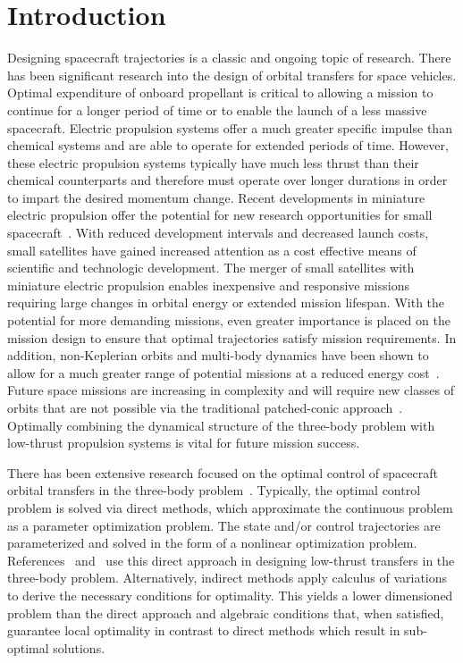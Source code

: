 \documentclass[preprint]{elsarticle}
\begin{document}
\section{Introduction}\label{sec:introduction}
Designing spacecraft trajectories is a classic and ongoing topic of research.
There has been significant research into the design of orbital transfers for space vehicles.
Optimal expenditure of onboard propellant is critical to allowing a mission to continue for a longer period of time or to enable the launch of a less massive spacecraft.
Electric propulsion systems offer a much greater specific impulse than chemical systems and are able to operate for extended periods of time.
However, these electric propulsion systems typically have much less thrust than their chemical counterparts and therefore must operate over longer durations in order to impart the desired momentum change.
Recent developments in miniature electric propulsion offer the potential for new research opportunities for small spacecraft~\cite{haque2013}.
With reduced development intervals and decreased launch costs, small satellites have gained increased attention as a cost effective means of scientific and technologic development. 
The merger of small satellites with miniature electric propulsion enables inexpensive and responsive missions requiring large changes in orbital energy or extended mission lifespan.
With the potential for more demanding missions, even greater importance is placed on the mission design to ensure that optimal trajectories satisfy mission requirements. 
In addition, non-Keplerian orbits and multi-body dynamics have been shown to allow for a much greater range of potential missions at a reduced energy cost~\cite{koon2011}.
Future space missions are increasing in complexity and will require new classes of orbits that are not possible via the traditional patched-conic approach~\cite{ross2006,gomez2001}.
Optimally combining the dynamical structure of the three-body problem with low-thrust propulsion systems is vital for future mission success.

There has been extensive research focused on the optimal control of spacecraft orbital transfers in the three-body problem~\cite{mingotti2011,grebow2011}.
Typically, the optimal control problem is solved via direct methods, which approximate the continuous problem as a parameter optimization problem.
The state and/or control trajectories are parameterized and solved in the form of a nonlinear optimization problem.
References~ and~ use this direct approach in designing low-thrust transfers in the three-body problem.
Alternatively, indirect methods apply calculus of variations to derive the necessary conditions for optimality. 
This yields a lower dimensioned problem than the direct approach and algebraic conditions that, when satisfied, guarantee local optimality in contrast to direct methods which result in sub-optimal solutions.
\end{document}
